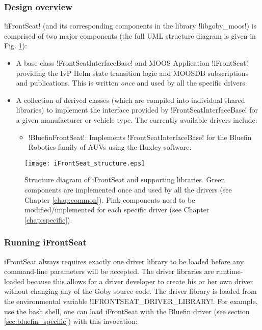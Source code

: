 \subsubsection{Design overview}

!iFrontSeat! (and its corresponding components in the library !libgoby_moos!) is comprised of two major components (the full UML structure diagram is given in Fig. \ref{fig:structure}):
\begin{itemize}
\item A base class !FrontSeatInterfaceBase! and MOOS Application !iFrontSeat! providing the IvP Helm state transition logic and MOOSDB subscriptions and publications. This is written \textit{once} and used by all the specific drivers. 
\item A collection of derived classes (which are compiled into individual shared libraries) to implement the interface provided by !FrontSeatInterfaceBase! for a given manufacturer or vehicle type. The currently available drivers include:
\begin{itemize}
\item !BluefinFrontSeat!: Implements !FrontSeatInterfaceBase! for the Bluefin Robotics family of AUVs using the Huxley software.
\end{itemize}
\end{itemize}

\begin{figure}
\centering
\texttt{[image: iFrontSeat\_structure.eps]}
\caption{Structure diagram of iFrontSeat and supporting libraries. Green components are implemented once and used by all the drivers (see Chapter \ref{chap:common}). Pink components need to be modified/implemented for each specific driver (see Chapter \ref{chap:specific}).}
\label{fig:structure}
\end{figure}

\subsubsection{Running iFrontSeat}

iFrontSeat always requires exactly one driver library to be loaded before any command-line parameters will be accepted. The driver libraries are runtime-loaded because this allows for a driver developer to create his or her own driver without changing any of the Goby source code. The driver library is loaded from the environmental variable !IFRONTSEAT_DRIVER_LIBRARY!. For example, use the bash shell, one can load iFrontSeat with the Bluefin driver (see section \ref{sec:bluefin_specific}) with this invocation:

